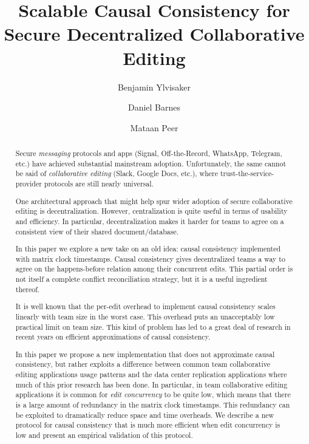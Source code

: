\documentclass[runningheads]{llncs}
\begin{document}
\title{Scalable Causal Consistency for Secure Decentralized Collaborative Editing}

\author{Benjamin Ylvisaker \and Daniel Barnes \and Mataan Peer}


\maketitle

\begin{abstract}

Secure \emph{messaging} protocols and apps (Signal, Off-the-Record, WhatsApp, Telegram, etc.) have achieved substantial mainstream adoption.
Unfortunately, the same cannot be said of \emph{collaborative editing} (Slack, Google Docs, etc.), where trust-the-service-provider protocols are still nearly universal.

One architectural approach that might help spur wider adoption of secure collaborative editing is decentralization.
However, centralization is quite useful in terms of usability and efficiency.
In particular, decentralization makes it harder for teams to agree on a consistent view of their shared document{\slash}database.

In this paper we explore a new take on an old idea: causal consistency implemented with matrix clock timestamps.
Causal consistency gives decentralized teams a way to agree on the happens-before relation among their concurrent edits.
This partial order is not itself a complete conflict reconciliation strategy, but it is a useful ingredient thereof.

It is well known that the per-edit overhead to implement causal consistency scales linearly with team size in the worst case.
This overhead puts an unacceptably low practical limit on team size.
This kind of problem has led to a great deal of research in recent years on efficient approximations of causal consistency.

In this paper we propose a new implementation that does not approximate causal consistency, but rather exploits a difference between common team collaborative editing applications usage patterns and the data center replication applications where much of this prior research has been done.
In particular, in team collaborative editing applications it is common for \emph{edit concurrency} to be quite low, which means that there is a large amount of redundancy in the matrix clock timestamps.
This redundancy can be exploited to dramatically reduce space and time overheads.
We describe a new protocol for causal consistency that is much more efficient when edit concurrency is low and present an empirical validation of this protocol.

\end{abstract}
\end{document}
